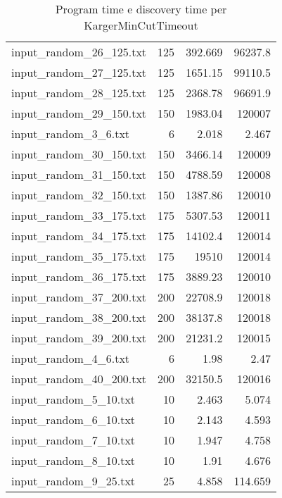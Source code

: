 \begin{table}[H]
\begin{tabular}{lrrr}
     input\_random\_26\_125.txt &     125 &          392.669 &      96237.8   \\
     input\_random\_27\_125.txt &     125 &         1651.15  &      99110.5   \\
     input\_random\_28\_125.txt &     125 &         2368.78  &      96691.9   \\
     input\_random\_29\_150.txt &     150 &         1983.04  &     120007     \\
     input\_random\_3\_6.txt    &       6 &            2.018 &          2.467 \\
     input\_random\_30\_150.txt &     150 &         3466.14  &     120009     \\
     input\_random\_31\_150.txt &     150 &         4788.59  &     120008     \\
     input\_random\_32\_150.txt &     150 &         1387.86  &     120010     \\
     input\_random\_33\_175.txt &     175 &         5307.53  &     120011     \\
     input\_random\_34\_175.txt &     175 &        14102.4   &     120014     \\
     input\_random\_35\_175.txt &     175 &        19510     &     120014     \\
     input\_random\_36\_175.txt &     175 &         3889.23  &     120010     \\
     input\_random\_37\_200.txt &     200 &        22708.9   &     120018     \\
     input\_random\_38\_200.txt &     200 &        38137.8   &     120018     \\
     input\_random\_39\_200.txt &     200 &        21231.2   &     120015     \\
     input\_random\_4\_6.txt    &       6 &            1.98  &          2.47  \\
     input\_random\_40\_200.txt &     200 &        32150.5   &     120016     \\
     input\_random\_5\_10.txt   &      10 &            2.463 &          5.074 \\
     input\_random\_6\_10.txt   &      10 &            2.143 &          4.593 \\
     input\_random\_7\_10.txt   &      10 &            1.947 &          4.758 \\
     input\_random\_8\_10.txt   &      10 &            1.91  &          4.676 \\
     input\_random\_9\_25.txt   &      25 &            4.858 &        114.659 \\
     \hline
    \end{tabular}

    \caption{Program time e discovery time per KargerMinCutTimeout}
    \label{table:kargertimeout-running-time}
\end{table}
